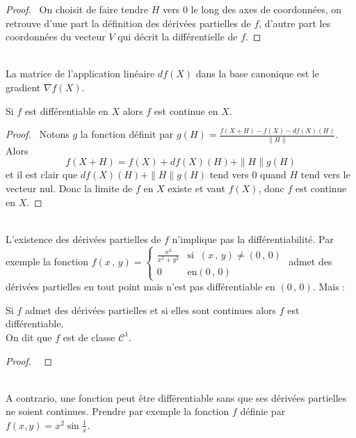 \documentclass[class=report,crop=false]{standalone}
\begin{document}
{{\begin{proof} \ \rm On choisit de faire tendre $H$ vers $0$ le long des axes de coordonnées, on retrouve d'une part la définition des dérivées partielles de $f$, d'autre part les coordonnées du vecteur $V$ qui décrit la différentielle de $f$.
\end{proof}


\\
La matrice de l'application linéaire $df(X)$ dans la base canonique est le gradient $\nabla f (X)$.


\begin{proposition}
Si $f$ est différentiable en $X$ alors $f$ est continue en $X$.
\end{proposition}

\begin{proof} \ \rm Notons $g$ la fonction définit par $g(H)=\frac{f(X + H) - f(X) - df(X)(H)}{\|H\|}$. Alors 
$$f(X + H)=f(X) + df(X)(H) +\|H\|g(H)$$
et il est clair que $df(X)(H) +\|H\|g(H)$ tend vers $0$ quand $H$ tend vers le vecteur nul. Donc la limite de $f$ en $X$ existe et vaut $f(X)$, donc $f$ est continue en $X$.
\end{proof}


\\
L'existence des dérivées partielles de $f$ n'implique pas la différentiabilité. Par exemple la fonction
$f(x\,,\,y) = \left \lbrace
\begin{array}{ll}
\frac{x^3}{x^2 + y^2} & \textrm{si}\;\; (x\,,\,y) \neq (0\,,\,0) \\
0 & \textrm{en} (0\,,\,0)
\end{array}
\right.$
admet des dérivées partielles en tout point mais n'est pas différentiable en $(0\,,\,0)$.
Mais :


\begin{theoreme}
Si $f$ admet des dérivées partielles et si elles sont continues alors $f$ est différentiable.\\
On dit que $f$ est de classe $\mathcal{C}^1$.
\end{theoreme}


\begin{proof} \ \rm 
\end{proof}


\\
A contrario, une fonction peut \^etre différentiable sans que ses dérivées partielles ne soient continues. Prendre par exemple la fonction $f$ définie par $f(x,y)=x^2\sin \frac{1}{x}$.


}}
\end{document}
